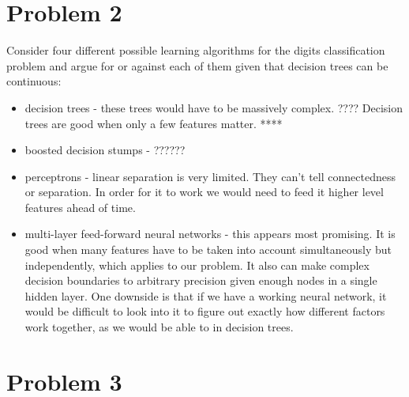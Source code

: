 \documentclass{article}
\begin{document}
  \section*{Problem 2}
  Consider four different possible learning algorithms for the digits
  classification problem and argue for or against each of them given that
  decision trees can be continuous: 
  \begin{itemize}
  \item decision trees - 
    these trees would have to be massively complex. ????
    Decision trees are good when only a few features matter. ****
  \item boosted decision stumps - ??????
  \item perceptrons - linear separation is very limited. They can't tell 
    connectedness or separation. In order for it to work we would need to
    feed it higher level features ahead of time.  

  \item multi-layer feed-forward neural networks - this appears most promising. 
    It is good when many features have to be taken into account simultaneously
    but independently, which applies to our problem. It also can make complex 
    decision boundaries to arbitrary precision given enough nodes in a single
    hidden layer. One downside is that if we have a working neural network,
    it would be difficult to look into it to figure out exactly how different
    factors work together, as we would be able to in decision trees. 
  \end{itemize}

  \section*{Problem 3}
\end{document}
